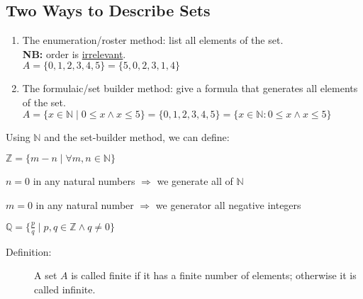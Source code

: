 \documentclass[10pt]{article}
\begin{document}
	\subsection{Two Ways to Describe Sets}
	\begin{enumerate}
		\item The enumeration/roster method: list all elements of the set.\\ \textbf{NB:} order is \underline{irrelevant}.\\ $A=\{0, 1, 2, 3, 4, 5\}=\{5, 0, 2, 3, 1, 4\}$
		\item The formulaic/set builder method: give a formula that generates all elements of the set.\\ $A=\{x \in \mathbb{N} \mid 0 \leq x \land x \leq 5\} = \{0, 1, 2, 3, 4, 5\} = \{x \in \mathbb{N} : 0 \leq x \land x \leq 5 \}$
	\end{enumerate}
	Using $\mathbb{N}$ and the set-builder method, we can define:
		
	$\mathbb{Z} = \{m-n \mid \forall m, n \in \mathbb{N} \}$
		
	\hspace{5mm} $n=0$ in any natural numbers $\Rightarrow$ we generate all of $\mathbb{N}$
		
	\hspace{5mm} $m=0$ in any natural number $\Rightarrow$ we generator all negative integers
		
	$\mathbb{Q} = \{\frac{p}{q} \mid p, q \in \mathbb{Z} \land q \neq 0 \}$
	\begin{description}
		\item[Definition:] A set $A$ is called finite if it has a finite number of elements; otherwise it is called infinite.
	\end{description}
		
\end{document}
